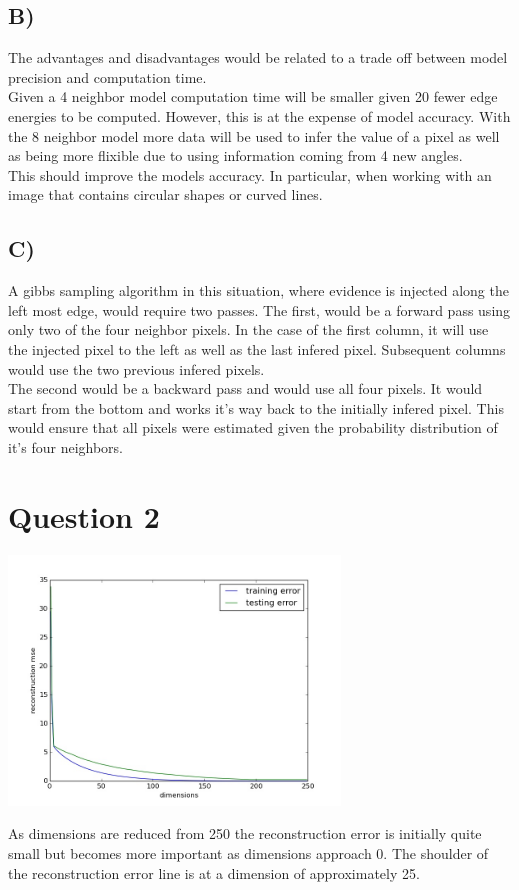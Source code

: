 \documentclass{report}
\begin{document}
\subsection*{B)}
The advantages and disadvantages would be related to a trade off between
model precision and computation time.\\

Given a 4 neighbor model computation time will be smaller given 20 fewer edge
energies to be computed. However, this is at the expense of model accuracy. With
the 8 neighbor model more data will be used to infer the value of a pixel as well
as being more flixible due to using information coming from 4 new angles. \\

This should improve the models accuracy. In particular, when working with an image
that contains circular shapes or curved lines.
\subsection*{C)}
A gibbs sampling algorithm in this situation, where evidence is injected along
the left most edge, would require two passes. The first, would be a forward pass
using only two of the four neighbor pixels. In the case of the first column, it
will use the injected pixel to the left as well as the last infered pixel. Subsequent
columns would use the two previous infered pixels.\\

The second would be a backward pass and would use all four pixels. It would start
from the bottom and works it's way back to the initially infered pixel. This would
ensure that all pixels were estimated given the probability distribution of it's four
neighbors.


\section*{Question 2}
\begin{center}
\includegraphics[width=250pt, keepaspectratio=true]{reconstruction_error.jpg}\\
\end{center}
As dimensions are reduced from 250 the reconstruction error is initially quite
small but becomes more important as dimensions approach 0. The
shoulder of the reconstruction error line is at a dimension of approximately 25.\\
\end{document}
